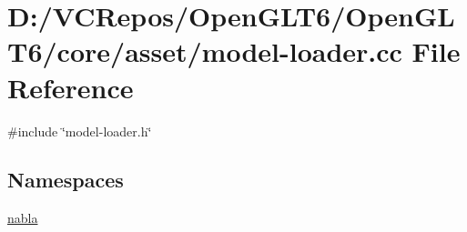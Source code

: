 \hypertarget{model-loader_8cc}{}\section{D\+:/\+V\+C\+Repos/\+Open\+G\+L\+T6/\+Open\+G\+L\+T6/core/asset/model-\/loader.cc File Reference}
\label{model-loader_8cc}
{\ttfamily \#include \char`\"{}model-\/loader.\+h\char`\"{}}\newline
\subsection*{Namespaces}
\begin{DoxyCompactItemize}
\item 
 \mbox{\hyperlink{namespacenabla}{nabla}}
\end{DoxyCompactItemize}
